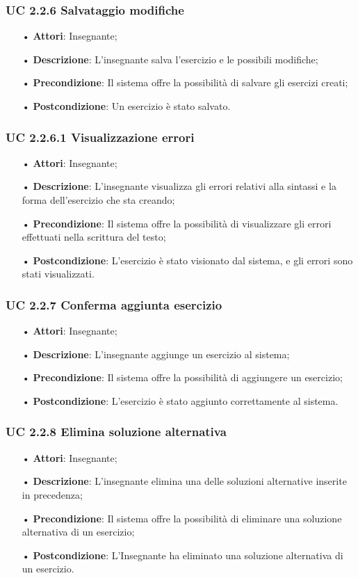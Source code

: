 \subsubsection{UC 2.2.6 Salvataggio modifiche}
\begin{itemize}
	\item[•] \textbf{Attori}: Insegnante;
	\item[•] \textbf{Descrizione}: L'insegnante salva l'esercizio e le possibili modifiche;
	\item[•] \textbf{Precondizione}: Il sistema offre la possibilità di salvare gli esercizi creati;
	\item[•] \textbf{Postcondizione}: Un esercizio è stato salvato.
\end{itemize}
\subsubsection{UC 2.2.6.1 Visualizzazione errori}
\begin{itemize}
	\item[•] \textbf{Attori}: Insegnante;
	\item[•] \textbf{Descrizione}: L'insegnante visualizza gli errori relativi alla sintassi e la forma dell’esercizio che sta creando;
	\item[•] \textbf{Precondizione}: Il sistema offre la possibilità di visualizzare gli errori effettuati nella scrittura del testo;
	\item[•] \textbf{Postcondizione}: L’esercizio è stato visionato dal sistema, e gli errori sono stati visualizzati.
\end{itemize}
\subsubsection{UC 2.2.7 Conferma aggiunta esercizio}
\begin{itemize}
	\item[•] \textbf{Attori}: Insegnante;
	\item[•] \textbf{Descrizione}: L'insegnante aggiunge un esercizio al sistema;
	\item[•] \textbf{Precondizione}: Il sistema offre la possibilità di aggiungere un esercizio;
	\item[•] \textbf{Postcondizione}: L’esercizio è stato aggiunto correttamente al sistema.
\end{itemize}

\subsubsection{UC 2.2.8 Elimina soluzione alternativa}
\begin{itemize}
	\item[•] \textbf{Attori}: Insegnante;
	\item[•] \textbf{Descrizione}: L'insegnante elimina una delle soluzioni alternative inserite in precedenza;
	\item[•] \textbf{Precondizione}: Il sistema offre la possibilità di eliminare una soluzione alternativa di un esercizio;
	\item[•] \textbf{Postcondizione}: L'Insegnante ha eliminato una soluzione alternativa di un esercizio.
\end{itemize}